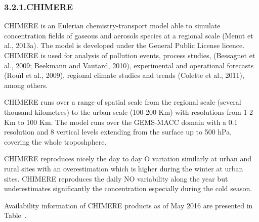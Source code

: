\documentclass[9pt]{report}
\begin{document}
\begin{table}[h!]
\begin{mdbmarginx}{}{}{}{}
\begin{mdcenter}
{{%
\mdhr{}%

\noindent{}%
}}%
\end{mdcenter}\label{models-2}%
\end{mdbmarginx}%
\end{table}%

\subsubsection{3.2.1.\hspace*{0.5em}CHIMERE}\label{sec-chimere}%

\noindent{}CHIMERE is an Eulerian chemistry-transport model able to simulate concentration ﬁelds of gaseous and aerosols species at a regional scale (Menut et al., 2013a). 
The model is developed under the General Public License licence. CHIMERE is used for analysis of pollution events, process studies, (Bessagnet et al., 2009; Beekmann and Vautard, 2010), experimental and operational forecasts (Rouïl et al., 2009), regional climate studies and trends (Colette et al., 2011), among others.%

CHIMERE runs over a range of spatial scale from the regional scale (several thousand kilometres) to the urban scale (100-200 Km) with resolutions from 1-2 Km to 100 Km. 
The model runs over the GEMS-MACC domain with a 0.1\textdegree{} resolution and 8 vertical levels extending from the surface up to 500 hPa, covering the whole troposhphere.%

CHIMERE reproduces nicely the day to day O variation similarly at urban and rural sites with an overestimation which is higher during the winter at urban sites. 
CHIMERE reproduces the daily NO variability along the year but underestimates significantly the concentration especially during the cold season.%

Availability information of CHIMERE products as of May 2016 are presented in Table~.%
\end{document}
